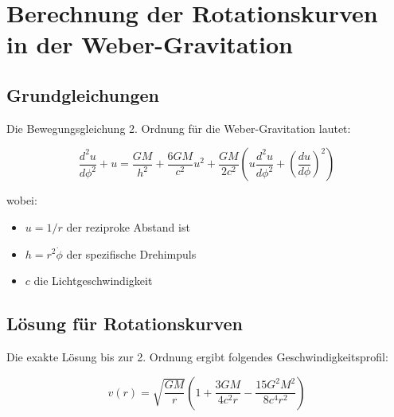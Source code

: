 \section{Berechnung der Rotationskurven in der Weber-Gravitation}

\subsection{Grundgleichungen}
Die Bewegungsgleichung 2. Ordnung für die Weber-Gravitation lautet:

\begin{equation}
\frac{d^2u}{d\phi^2} + u = \frac{GM}{h^2} + \frac{6GM}{c^2}u^2 + \frac{GM}{2c^2}\left(u\frac{d^2u}{d\phi^2} + \left(\frac{du}{d\phi}\right)^2\right)
\end{equation}

wobei:
\begin{itemize}
\item $u = 1/r$ der reziproke Abstand ist
\item $h = r^2\dot{\phi}$ der spezifische Drehimpuls
\item $c$ die Lichtgeschwindigkeit
\end{itemize}

\subsection{Lösung für Rotationskurven}
Die exakte Lösung bis zur 2. Ordnung ergibt folgendes Geschwindigkeitsprofil:

\begin{equation}
\label{eq:galaxie_rotation}
v(r) = \sqrt{\frac{GM}{r}}\left(1 + \frac{3GM}{4c^2r} - \frac{15G^2M^2}{8c^4r^2}\right)
\end{equation}

